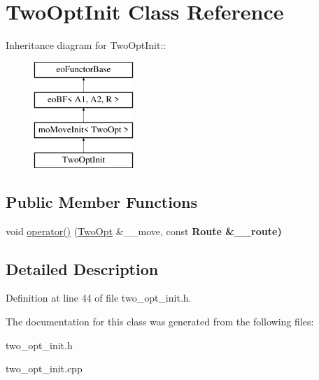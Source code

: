 \hypertarget{classTwoOptInit}{
\section{Two\-Opt\-Init Class Reference}
\label{classTwoOptInit}
}
Inheritance diagram for Two\-Opt\-Init::\begin{figure}[H]
\begin{center}
\leavevmode
\includegraphics[height=4cm]{classTwoOptInit}
\end{center}
\end{figure}
\subsection*{Public Member Functions}
\begin{CompactItemize}
\item 
\hypertarget{classTwoOptInit_5bf6af064d37ebd955ffb5a623e78e1b}{
void \hyperlink{classTwoOptInit_5bf6af064d37ebd955ffb5a623e78e1b}{operator()} (\hyperlink{classTwoOpt}{Two\-Opt} \&\_\-\_\-move, const \bf{Route} \&\_\-\_\-route)}
\label{classTwoOptInit_5bf6af064d37ebd955ffb5a623e78e1b}

\end{CompactItemize}


\subsection{Detailed Description}




Definition at line 44 of file two\_\-opt\_\-init.h.

The documentation for this class was generated from the following files:\begin{CompactItemize}
\item 
two\_\-opt\_\-init.h\item 
two\_\-opt\_\-init.cpp\end{CompactItemize}

